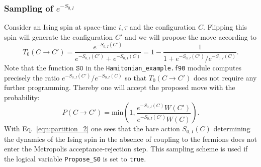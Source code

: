 \documentclass{SciPost}
\begin{document}
\subsubsection{Sampling of $e^{-S_{0,I}}$}
% 
Consider an Ising spin at space-time $i,\tau$ and the configuration $C$. Flipping this spin will generate the configuration $C'$ and we will propose the move according to 
  \begin{equation}
 T_0(C \rightarrow C')  =  \frac{e^{-S_{0,I}(C')}}{ e^{-S_{0,I}(C')} + e^{-S_{0,I}(C)} }   = 1 - \frac{1}{1 +  e^{-S_{0,I}(C')} /e^{-S_{0,I}(C)}}.
  \end{equation}
 Note that the function $\texttt{S0}$ in the  \texttt{Hamitonian\_example.f90}  module  computes precisely the ratio ${e^{-S_{0,I}(C')} /e^{-S_{0,I}(C)}}$ so that  $T_0(C \rightarrow C') $ does not require any further programming. 
 Thereby one will accept the proposed move with the probability: 
 \begin{equation}
 P(C \rightarrow C') =  \text{min}  \left( 1,  \frac{e^{-S_{0,I}(C)}   W(C')}{ e^{-S_{0,I}(C')} W(C)} \right).
 \end{equation}
 With Eq.~\ref{eqn:partition_2}  one sees that the bare action $S_{0,I}(C)$  determining the  dynamics of the Ising spin  in the absence of coupling to the fermions  does not enter the Metropolis acceptance-rejection step. This sampling scheme is used if the logical variable \texttt{Propose\_S0} is set to \texttt{true}.
% 
\end{document}
